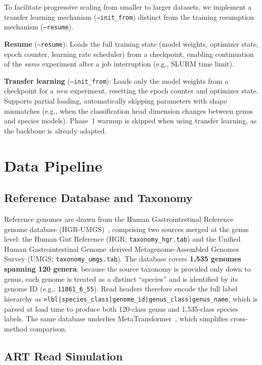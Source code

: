 To facilitate progressive scaling from smaller to larger datasets, we implement a transfer learning mechanism (\texttt{--init\_from}) distinct from the training resumption mechanism (\texttt{--resume}).

\textbf{Resume} (\texttt{--resume}): Loads the full training state (model weights, optimizer state, epoch counter, learning rate scheduler) from a checkpoint, enabling continuation of the \emph{same} experiment after a job interruption (e.g., SLURM time limit).

\textbf{Transfer learning} (\texttt{--init\_from}): Loads only the model weights from a checkpoint for a \emph{new} experiment, resetting the epoch counter and optimizer state. Supports partial loading, automatically skipping parameters with shape mismatches (e.g., when the classification head dimension changes between genus and species models). Phase~1 warmup is skipped when using transfer learning, as the backbone is already adapted.

\section{Data Pipeline}
\label{sec:method-data}

\subsection{Reference Database and Taxonomy}

Reference genomes are drawn from the Human Gastrointestinal Reference genome database (HGR-UMGS)~\cite{Almeida2019}, comprising two sources merged at the genus level: the Human Gut Reference (HGR; \texttt{taxonomy\_hgr.tab}) and the Unified Human Gastrointestinal Genome--derived Metagenome-Assembled Genomes Survey (UMGS; \texttt{taxonomy\_umgs.tab}).
The database covers \textbf{1{,}535 genomes spanning 120 genera}; because the source taxonomy is provided only down to genus, each genome is treated as a distinct ``species'' and is identified by its genome ID (e.g., \texttt{11861\_6\_55}).
Read headers therefore encode the full label hierarchy as
\texttt{>lbl|species\_class|genome\_id|genus\_class|genus\_name},
which is parsed at load time to produce both 120-class genus and 1{,}535-class species labels.
The same database underlies MetaTransformer~\cite{Wichmann2023}, which simplifies cross-method comparison.

\subsection{ART Read Simulation}

